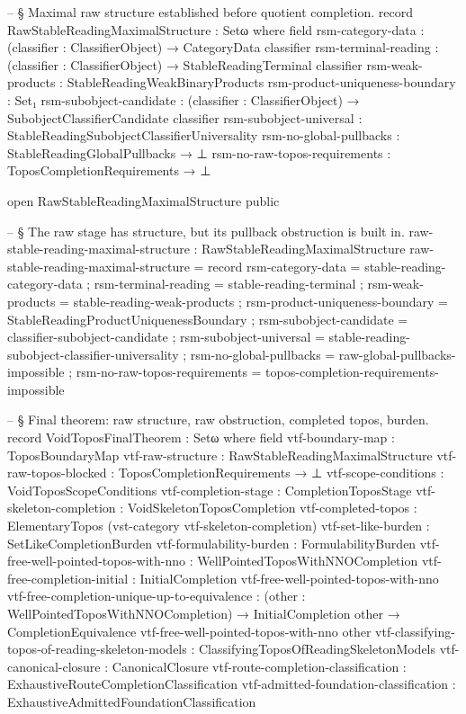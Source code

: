 \documentclass[11pt]{article}
\begin{document}
\begin{code}
-- § Maximal raw structure established before quotient completion.
record RawStableReadingMaximalStructure : Setω where
  field
    rsm-category-data : (classifier : ClassifierObject) → CategoryData classifier
    rsm-terminal-reading : (classifier : ClassifierObject) →
                           StableReadingTerminal classifier
    rsm-weak-products : StableReadingWeakBinaryProducts
    rsm-product-uniqueness-boundary : Set₁
    rsm-subobject-candidate : (classifier : ClassifierObject) →
                              SubobjectClassifierCandidate classifier
    rsm-subobject-universal : StableReadingSubobjectClassifierUniversality
    rsm-no-global-pullbacks : StableReadingGlobalPullbacks → ⊥
    rsm-no-raw-topos-requirements : ToposCompletionRequirements → ⊥

open RawStableReadingMaximalStructure public

-- § The raw stage has structure, but its pullback obstruction is built in.
raw-stable-reading-maximal-structure : RawStableReadingMaximalStructure
raw-stable-reading-maximal-structure = record
  { rsm-category-data              = stable-reading-category-data
  ; rsm-terminal-reading           = stable-reading-terminal
  ; rsm-weak-products              = stable-reading-weak-products
  ; rsm-product-uniqueness-boundary = StableReadingProductUniquenessBoundary
  ; rsm-subobject-candidate        = classifier-subobject-candidate
  ; rsm-subobject-universal        = stable-reading-subobject-classifier-universality
  ; rsm-no-global-pullbacks        = raw-global-pullbacks-impossible
  ; rsm-no-raw-topos-requirements  = topos-completion-requirements-impossible
  }

-- § Final theorem: raw structure, raw obstruction, completed topos, burden.
record VoidToposFinalTheorem : Setω where
  field
    vtf-boundary-map        : ToposBoundaryMap
    vtf-raw-structure       : RawStableReadingMaximalStructure
    vtf-raw-topos-blocked   : ToposCompletionRequirements → ⊥
    vtf-scope-conditions    : VoidToposScopeConditions
    vtf-completion-stage    : CompletionToposStage
    vtf-skeleton-completion : VoidSkeletonToposCompletion
    vtf-completed-topos     : ElementaryTopos (vst-category vtf-skeleton-completion)
    vtf-set-like-burden     : SetLikeCompletionBurden
    vtf-formulability-burden : FormulabilityBurden
    vtf-free-well-pointed-topos-with-nno : WellPointedToposWithNNOCompletion
    vtf-free-completion-initial :
      InitialCompletion vtf-free-well-pointed-topos-with-nno
    vtf-free-completion-unique-up-to-equivalence :
      (other : WellPointedToposWithNNOCompletion) →
      InitialCompletion other →
      CompletionEquivalence vtf-free-well-pointed-topos-with-nno other
    vtf-classifying-topos-of-reading-skeleton-models :
      ClassifyingToposOfReadingSkeletonModels
    vtf-canonical-closure   : CanonicalClosure
    vtf-route-completion-classification :
      ExhaustiveRouteCompletionClassification
    vtf-admitted-foundation-classification :
      ExhaustiveAdmittedFoundationClassification


\end{code}
\end{document}
